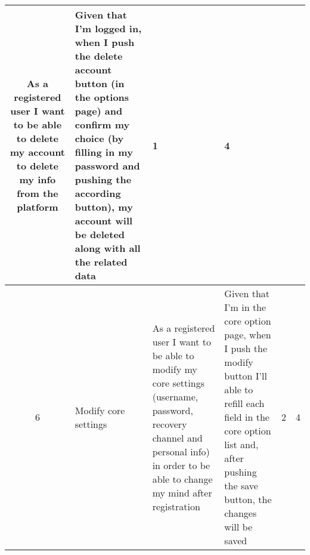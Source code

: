 \begin{tabular}{|c|m{1.5cm}|m{4cm}|m{4cm}|c|c|}
	As a registered user I want to be able to delete my account to delete my info from the platform & 
	Given that I'm logged in, when I push the delete account button (in the options page) and confirm my choice (by filling in my password and pushing the according button), my account will be deleted along with all the related data &
	1 & 4 \\
	\hline
	6 & Modify core settings & 
	As a registered user I want to be able to modify my core settings (username, password, recovery channel and personal info) in order to be able to change my mind after registration & 
	Given that I'm in the core option page, when I push the modify button I'll able to refill each field in the core option list and, after pushing the save button, the changes will be saved &
	2 & 4 \\
	\hline
\end{tabular}    
\newpage
